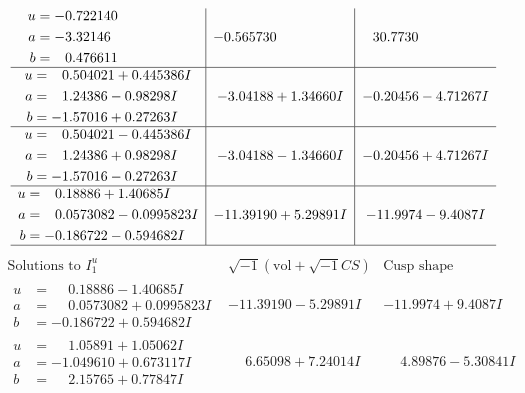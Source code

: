 \documentclass[1p]{elsarticle_modified}
\theoremstyle{definition}
\newcommand{\I}{\sqrt{-1}}
\begin{document}
$$\begin{array}{c|c|c}
\begin{aligned}
u &= -0.722140\phantom{ +0.000000I} \\
a &= -3.32146\phantom{ +0.000000I} \\
b &= \phantom{-}0.476611\phantom{ +0.000000I}\end{aligned}
 & -0.565730\phantom{ +0.000000I} & \phantom{-}30.7730\phantom{ +0.000000I} \\ \hline\begin{aligned}
u &= \phantom{-}0.504021 + 0.445386 I \\
a &= \phantom{-}1.24386 - 0.98298 I \\
b &= -1.57016 + 0.27263 I\end{aligned}
 & -3.04188 + 1.34660 I & -0.20456 - 4.71267 I \\ \hline\begin{aligned}
u &= \phantom{-}0.504021 - 0.445386 I \\
a &= \phantom{-}1.24386 + 0.98298 I \\
b &= -1.57016 - 0.27263 I\end{aligned}
 & -3.04188 - 1.34660 I & -0.20456 + 4.71267 I \\ \hline\begin{aligned}
u &= \phantom{-}0.18886 + 1.40685 I \\
a &= \phantom{-}0.0573082 - 0.0995823 I \\
b &= -0.186722 - 0.594682 I\end{aligned}
 & -11.39190 + 5.29891 I & -11.9974 - 9.4087 I\\
 \hline 
 \end{array}$$\newpage$$\begin{array}{c|c|c}  
\text{Solutions to }I^u_{1}& \I (\text{vol} + \sqrt{-1}CS) & \text{Cusp shape}\\
 \hline 
\begin{aligned}
u &= \phantom{-}0.18886 - 1.40685 I \\
a &= \phantom{-}0.0573082 + 0.0995823 I \\
b &= -0.186722 + 0.594682 I\end{aligned}
 & -11.39190 - 5.29891 I & -11.9974 + 9.4087 I \\ \hline\begin{aligned}
u &= \phantom{-}1.05891 + 1.05062 I \\
a &= -1.049610 + 0.673117 I \\
b &= \phantom{-}2.15765 + 0.77847 I\end{aligned}
 & \phantom{-}6.65098 + 7.24014 I & \phantom{-}4.89876 - 5.30841 I \\ \hline\begin{aligned}

\end{aligned}
\end{array}$$
\end{document}
